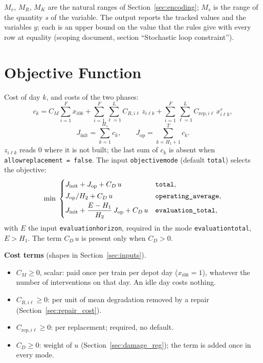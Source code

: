 \documentclass[11pt,a4paper]{article}
\theoremstyle{plain}
\theoremstyle{definition}
\renewcommand{\_}{\textunderscore\allowbreak{}}
\begin{document}
$M_v$, $M_R$, $M_K$ are the natural ranges of Section~\ref{sec:encoding}; $M_s$ is the
range of the quantity $s$ of the variable. The output
reports the tracked values and the variables $y$; each is an upper bound on the value that the rules give
with every row at equality (scoping document, section ``Stochastic loop
constraint'').

\section{Objective Function}
\label{sec:objective}

Cost of day $k$, and costs of the two phases:
\begin{equation}
  c_k = C_M \sum_{i=1}^{F} x_{i0k}
      + \sum_{i=1}^{F}\sum_{\ell=1}^{L} C_{R,i\ell}\, z_{i\ell k}
      + \sum_{i=1}^{F}\sum_{\ell=1}^{L} C_{\mathrm{rep},i\ell}\, x^r_{i\ell k},
  \label{eq:a_daycost}
\end{equation}
\begin{equation}
  J_{\mathrm{init}} = \sum_{k=1}^{H_1} c_k, \qquad
  J_{\mathrm{op}} = \sum_{k=H_1+1}^{T} c_k .
  \label{eq:a_phases}
\end{equation}
$z_{i\ell k}$ reads $0$ where it is not built; the last sum of $c_k$ is absent when
\texttt{allow\_replacement = false}. The input \texttt{objective\_mode} (default
\texttt{total}) selects the objective:
\begin{equation}
  \min\;
  \begin{cases}
    J_{\mathrm{init}} + J_{\mathrm{op}} + C_D\, u & \texttt{total}, \\[2pt]
    J_{\mathrm{op}} / H_2 + C_D\, u & \texttt{operating\_average}, \\[2pt]
    J_{\mathrm{init}} + \dfrac{E - H_1}{H_2}\, J_{\mathrm{op}} + C_D\, u
      & \texttt{evaluation\_total},
  \end{cases}
  \label{eq:a_objective}
\end{equation}
with $E$ the input \texttt{evaluation\_horizon}, required in the mode
\texttt{evaluation\_total}, $E > H_1$. The term $C_D\,u$ is present only when
$C_D > 0$.

\textbf{Cost terms} (shapes in Section~\ref{sec:inputs}).
\begin{itemize}[nosep,leftmargin=1.5em]
  \item $C_M \geq 0$, scalar: paid once per train per depot day ($x_{i0k} = 1$),
        whatever the number of interventions on that day. An idle day costs nothing.
  \item $C_{R,i\ell} \geq 0$: per unit of mean degradation removed by a repair
        (Section~\ref{sec:repair_cost}).
  \item $C_{\mathrm{rep},i\ell} \geq 0$: per replacement; required, no default.
  \item $C_D \geq 0$: weight of $u$ (Section~\ref{sec:damage_reg}); the term is added
        once in every mode.
\end{itemize}
\end{document}
